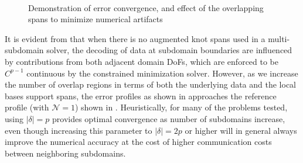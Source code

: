 \begin{figure}[htbp]
	\centering
	\hfill
	\\
	\hfill
	\caption{Demonstration of error convergence, and effect of the overlapping spans to minimize numerical artifacts}
	\label{fig:error-1d}
\end{figure}

It is evident from  that when there is no augmented knot spans used in a multi-subdomain solver, the decoding of data at subdomain boundaries are influenced by contributions from both adjacent domain DoFs, which are enforced to be $C^{p-1}$ continuous by the constrained minimization solver. However, as we increase the number of overlap regions in terms of both the underlying data and the local bases support spans, the error profiles as shown in  approaches the reference profile (with $\mathcal{N}=1$) shown in . Heuristically, for many of the problems tested, using $\left| \delta \right|=p$ provides optimal convergence as number of subdomains increase, even though increasing this parameter to $\left| \delta \right| =2p$ or higher will in general always improve the numerical accuracy at the cost of higher communication costs between neighboring subdomains.

